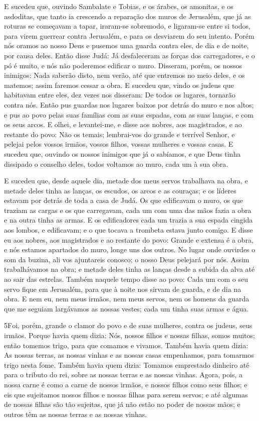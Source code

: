 E sucedeu que, ouvindo Sambalate e Tobias, e os árabes, os
amonitas, e os asdoditas, que tanto ia crescendo a reparação dos
muros de Jerusalém, que já as roturas se começavam a tapar,
iraram-se sobremodo, e ligaram-se entre si todos, para virem
guerrear contra Jerusalém, e para os desviarem do seu intento.
Porém nós oramos ao nosso Deus e pusemos uma guarda contra eles,
de dia e de noite, por causa deles. Então disse Judá: Já
desfaleceram as forças dos carregadores, e o pó é muito, e nós não
poderemos edificar o muro. Disseram, porém, os nossos
inimigos: Nada saberão disto, nem verão, até que entremos no meio
deles, e os matemos; assim faremos cessar a obra. E sucedeu
que, vindo os judeus que habitavam entre eles, dez vezes nos
disseram: De todos os lugares, tornarão contra nós. Então pus
guardas nos lugares baixos por detrás do muro e nos altos; e pus ao
povo pelas suas famílias com as suas espadas, com as suas lanças, e
com os seus arcos. E olhei, e levantei-me, e disse aos
nobres, aos magistrados, e ao restante do povo: Não os temais;
lembrai-vos do grande e terrível Senhor, e pelejai pelos vossos
irmãos, vossos filhos, vossas mulheres e vossas casas. E
sucedeu que, ouvindo os nossos inimigos que já o sabíamos, e que
Deus tinha dissipado o conselho deles, todos voltamos ao muro, cada
um à sua obra.

E sucedeu que, desde aquele dia, metade dos meus servos
trabalhava na obra, e metade deles tinha as lanças, os escudos, os
arcos e as couraças; e os líderes estavam por detrás de toda a casa
de Judá. Os que edificavam o muro, os que traziam as cargas e
os que carregavam, cada um com uma das mãos fazia a obra e na outra
tinha as armas. E os edificadores cada um trazia a sua espada
cingida aos lombos, e edificavam; e o que tocava a trombeta estava
junto comigo. E disse eu aos nobres, aos magistrados e ao
restante do povo: Grande e extensa é a obra, e nós estamos apartados
do muro, longe uns dos outros. No lugar onde ouvirdes o som
da buzina, ali vos ajuntareis conosco; o nosso Deus pelejará por
nós. Assim trabalhávamos na obra; e metade deles tinha as
lanças desde a subida da alva até ao sair das estrelas.
Também naquele tempo disse ao povo: Cada um com o seu servo
fique em Jerusalém, para que à noite nos sirvam de guarda, e de dia
na obra. E nem eu, nem meus irmãos, nem meus servos, nem os
homens da guarda que me seguiam largávamos as nossas vestes; cada um
tinha suas armas e água.

\medskip

\lettrine{5} Foi, porém, grande o clamor do povo e de suas
mulheres, contra os judeus, seus irmãos. Porque havia quem
dizia: Nós, nossos filhos e nossas filhas, somos muitos; então
tomemos trigo, para que comamos e vivamos. Também havia quem
dizia: As nossas terras, as nossas vinhas e as nossas casas
empenhamos, para tomarmos trigo nesta fome. Também havia quem
dizia: Tomamos emprestado dinheiro até para o tributo do rei, sobre
as nossas terras e as nossas vinhas. Agora, pois, a nossa carne
é como a carne de nossos irmãos, e nossos filhos como seus filhos; e
eis que sujeitamos nossos filhos e nossas filhas para serem servos;
e até algumas de nossas filhas são tão sujeitas, que já não estão no
poder de nossas mãos; e outros têm as nossas terras e as nossas
vinhas.

